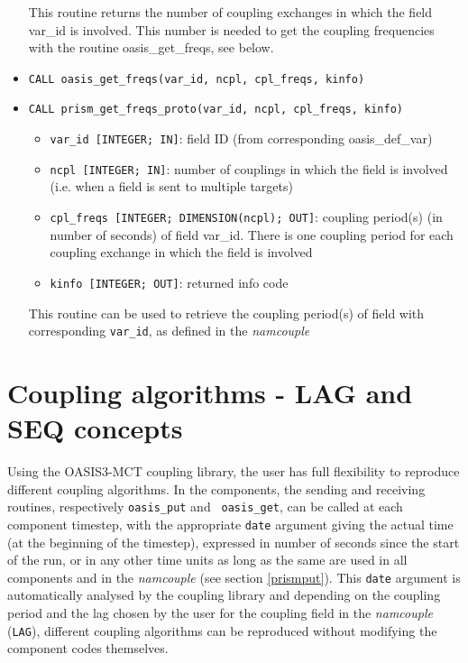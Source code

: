 \begin{itemize}
This routine returns the number of coupling exchanges in which the field var\_id is
involved. This number is needed to get the coupling frequencies with the
routine oasis\_get\_freqs, see below.

\item {\tt CALL oasis\_get\_freqs(var\_id, ncpl, cpl\_freqs, kinfo)}
\item {\tt CALL prism\_get\_freqs\_proto(var\_id, ncpl, cpl\_freqs, kinfo)}
  \begin{itemize}
  \item {\tt var\_id [INTEGER; IN]}: field ID (from
  corresponding oasis\_def\_var)
  \item {\tt ncpl [INTEGER; IN]}: number of couplings in which the field
  is involved (i.e. when a field is sent to multiple targets)
   \item {\tt cpl\_freqs [INTEGER; DIMENSION(ncpl); OUT]}: coupling period(s) 
  (in number of seconds) of field var\_id. There is one coupling period for
  each coupling exchange in which the field is involved
  \item {\tt kinfo [INTEGER; OUT]}: returned info code
  \end{itemize}

This routine can be used to retrieve the coupling period(s) of field with
corresponding {\tt var\_id}, as defined in the {\it namcouple}

\end{itemize}

\section{Coupling algorithms - LAG and SEQ concepts}
\label{subsubsec_Algoritms}

Using the OASIS3-MCT coupling library, the user has full flexibility
to reproduce different coupling algorithms. In the components, the
sending and receiving routines, respectively {\tt oasis\_put} and {\tt
  oasis\_get}, can be called at each component timestep, with the
appropriate {\tt date} argument giving the actual time (at the
beginning of the timestep), expressed in number of seconds since the
start of the run, or in any other time units as long as the same are
used in all components and in the {\it namcouple} (see section
\ref{prismput}). This {\tt date} argument is automatically analysed by
the coupling library and depending on the coupling period and the lag chosen by the user for the coupling field in the {\it namcouple} ({\tt LAG}), different coupling algorithms can be reproduced
without modifying the component codes themselves.

